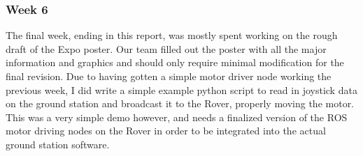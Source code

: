 \subsubsection{Week 6}
The final week, ending in this report, was mostly spent working on the rough draft of the Expo poster. Our team filled out the poster with all the major information and graphics and should only require minimal modification for the final revision. Due to having gotten a simple motor driver node working the previous week, I did write a simple example python script to read in joystick data on the ground station and broadcast it to the Rover, properly moving the motor. This was a very simple demo however, and needs a finalized version of the ROS motor driving nodes on the Rover in order to be integrated into the actual ground station software.

